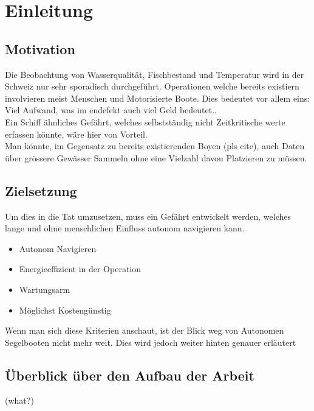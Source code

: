 
\chapter{Einleitung }
\label{chap:einleitung}

\section{Motivation}
Die Beobachtung von Wasserqualität, Fischbestand und Temperatur wird in der Schweiz nur sehr sporadisch durchgeführt. Operationen welche bereits existiern involvieren meist Menschen und Motorisierte Boote. Dies bedeutet vor allem eins: Viel Aufwand, was im endefekt auch viel Geld bedeutet.. \\
Ein Schiff ähnliches Gefährt, welches selbstständig nicht Zeitkritische werte erfassen könnte, wäre hier von Vorteil.
\\
Man könnte, im Gegensatz zu bereits existierenden Boyen (pls cite), auch Daten über grössere Gewässer Sammeln ohne eine Vielzahl davon Platzieren zu müssen. 
\\

\section{Zielsetzung}
Um dies in die Tat umzusetzen, muss ein Gefährt entwickelt werden, welches lange und ohne menschlichen Einfluss autonom navigieren kann. 

\begin{itemize}
    \item Autonom Navigieren
    \item Energieeffizient in der Operation
    \item Wartungsarm
    \item Möglichst Kostengünstig
\end{itemize}

Wenn man sich diese Kriterien anschaut, ist der Blick weg von Autonomen Segelbooten nicht mehr weit. Dies wird jedoch weiter hinten genauer erläutert

\section{Überblick über den Aufbau der Arbeit}
(what?)
